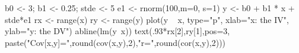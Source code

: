 \begin{Schunk}
\begin{Sinput}
 b0 <- 3; b1 <- 0.25; stde <- 5
 e1 <- rnorm(100,m=0, s=1)
 y <- b0 + b1 * x + stde*e1
 rx <- range(x)
 ry <- range(y)
 plot(y ~ x, type="p", xlab="x: the IV", ylab="y: the DV")
 abline(lm(y~x))
 text(.93*rx[2],ry[1],pos=3, paste("Cov[x,y]=",round(cov(x,y),2),"\n r=",round(cor(x,y),2)))
\end{Sinput}
\end{Schunk}
